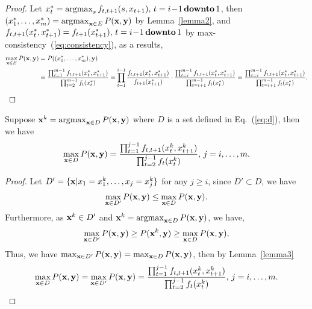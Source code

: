 \begin{proof}
Let $x_t^* = \operatorname*{argmax}_{s} f_{t, t+1}(s, x_{t+1}), \, t = i\!-\!1 \,\textbf{downto}\, 1$, 
then $(x_1^*,\dots,x_m^*) = \operatorname*{argmax}_{\mathbf{x} \in E} P(\mathbf{x},\mathbf{y})$ by Lemma~\ref{lemma2},
and $f_{t,t+1}(x_t^*, x_{t+1}^*) = f_{t+1}(x_{t+1}^*),\,t = i\!-\!1 \,\textbf{downto}\, 1$ by max-consistency~(\ref{eq:consistency}),
as a results,
\begin{align*}
\max_{\x \in E} P(\x,\y) &= P((x_1^*,\dots,x_m^*), \y) \\
&= \frac{\prod_{t=1}^{m-1} f_{t,t+1}(x_t^*, x_{t+1}^*)} {\prod_{t=2}^{m-1} f_t(x_t^*)} %
= \prod_{t=1}^{i-1} \frac{f_{t,t+1}(x_t^*, x_{t+1}^*)} {f_{t+1}(x_{t+1}^*)}  \cdot
  \frac{\prod_{t=i}^{m-1} f_{t,t+1}(x_t^*, x_{t+1}^*)} {\prod_{t=i+1}^{m-1} f_t(x_t^*)} 
= \frac{\prod_{t=i}^{m-1} f_{t,t+1}(x_t^*, x_{t+1}^*)} {\prod_{t=i+1}^{m-1} f_t(x_t^*)}.
\end{align*}
\end{proof}

\begin{lemma}
\label{lemma5}
Suppose $\mathbf{x}^k = \operatorname*{argmax}_{\mathbf{x} \in D} P(\mathbf{x},\mathbf{y})$ where $D$ is a set defined in Eq.~(\ref{eq:d}),
then we have
\begin{equation*}
\max_{\mathbf{x} \in D} P(\mathbf{x},\mathbf{y}) = \frac{\prod_{t=1}^{j-1} f_{t,t+1}(x_t^k, x_{t+1}^k)} {\prod_{t=2}^{j-1} f_t(x_t^k)},
\, j = i, \dots, m.
\end{equation*}
\end{lemma}

\begin{proof}
Let $D' = \{\mathbf{x} |x_1 = x_1^k, \dots, x_j = x_j^k \}$ for any $j \ge i$,
since $D' \subset D$, we have
\begin{equation*}
\max_{\mathbf{x} \in D'} P(\mathbf{x},\mathbf{y}) \le \max_{\mathbf{x} \in D} P(\mathbf{x},\mathbf{y}).
\end{equation*}
Furthermore, as $\mathbf{x}^k \in D'$ and $\mathbf{x}^k = \operatorname*{argmax}_{\mathbf{x} \in D} P(\mathbf{x},\mathbf{y})$,
we have,
\begin{equation*}
\max_{\mathbf{x} \in D'} P(\mathbf{x},\mathbf{y}) \ge P(\mathbf{x}^k,\mathbf{y}) \ge \max_{\mathbf{x} \in D} P(\mathbf{x},\mathbf{y}),
\end{equation*}
Thus, we have $\max_{\mathbf{x} \in D'} P(\mathbf{x},\mathbf{y}) = \max_{\mathbf{x} \in D} P(\mathbf{x},\mathbf{y})$,
then by Lemma~\ref{lemma3}
\begin{equation*}
\max_{\mathbf{x} \in D} P(\mathbf{x},\mathbf{y}) = \max_{\mathbf{x} \in D'} P(\mathbf{x},\mathbf{y}) 
= \frac{\prod_{t=1}^{j-1} f_{t,t+1}(x_t^k, x_{t+1}^k)} {\prod_{t=2}^{j-1} f_t(x_t^k)},
\, j = i, \dots, m.
\end{equation*}
\end{proof}

